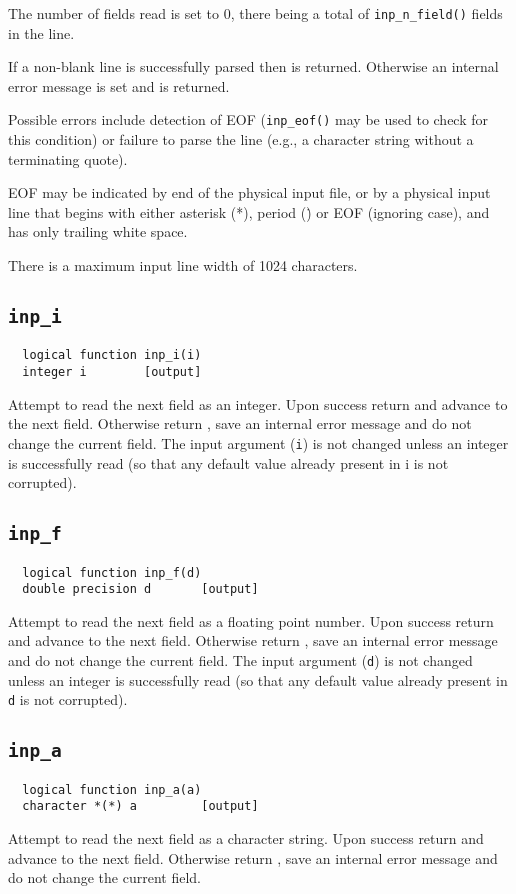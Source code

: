 The number of fields read is set to 0, there being a total of
\verb+inp_n_field()+ fields in the line.

If a non-blank line is successfully parsed then \TRUE is returned.
Otherwise an internal error message is set and \FALSE is returned.

Possible errors include detection of EOF ({\tt inp\_eof()} may be used to
check for this condition) or failure to parse the line (e.g., a
character string without a terminating quote).

EOF may be indicated by end of the physical input file, or by a
physical input line that begins with either asterisk (*), period (\.)
or EOF (ignoring case), and has only trailing white space.

There is a maximum input line width of 1024 characters.

\subsection{{\tt inp\_i}}
\begin{verbatim}
  logical function inp_i(i)
  integer i        [output]
\end{verbatim}
Attempt to read the next field as an integer.  Upon success return
\TRUE and advance to the next field.  Otherwise return \FALSE,
save an internal error message and do not change the
current field.  The input argument ({\tt i}) is not changed unless an
integer is successfully read (so that any default value already
present in i is not corrupted).

\subsection{{\tt inp\_f}}
\begin{verbatim}
  logical function inp_f(d)
  double precision d       [output]
\end{verbatim}
Attempt to read the next field as a floating point number.  Upon
success return \TRUE and advance to the next field.  Otherwise
return \FALSE, save an internal error message and do not change
the current field.  The input argument ({\tt d}) is not changed unless
an integer is successfully read (so that any default value already
present in {\tt d} is not corrupted).

\subsection{{\tt inp\_a}}
\begin{verbatim}
  logical function inp_a(a)
  character *(*) a         [output]
\end{verbatim}
Attempt to read the next field as a character string.  Upon success
return \TRUE and advance to the next field.  Otherwise return
\FALSE, save an internal error message and do not change the
current field.

